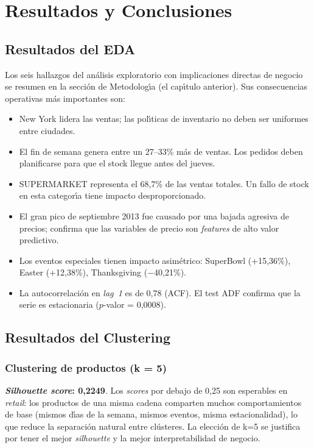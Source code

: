 \documentclass[12pt, a4paper, oneside]{report}
\begin{document}
\chapter{Resultados y Conclusiones}

\section{Resultados del EDA}

Los seis hallazgos del an\'alisis exploratorio con implicaciones directas de negocio se resumen en la secci\'on de Metodolog\'{\i}a (el cap\'{\i}tulo anterior). Sus consecuencias operativas m\'as importantes son:

\begin{itemize}[leftmargin=*, noitemsep]
  \item New York lidera las ventas; las pol\'{\i}ticas de inventario no deben ser uniformes entre ciudades.
  \item El fin de semana genera entre un 27--33\% m\'as de ventas. Los pedidos deben planificarse para que el stock llegue antes del jueves.
  \item SUPERMARKET representa el 68,7\% de las ventas totales. Un fallo de stock en esta categor\'{\i}a tiene impacto desproporcionado.
  \item El gran pico de septiembre 2013 fue causado por una bajada agresiva de precios; confirma que las variables de precio son \textit{features} de alto valor predictivo.
  \item Los eventos especiales tienen impacto asim\'etrico: SuperBowl (+15,36\%), Easter (+12,38\%), Thanksgiving ($-$40,21\%).
  \item La autocorrelaci\'on en \textit{lag~1} es de 0,78 (ACF). El test ADF confirma que la serie es estacionaria ($p$-valor = 0,0008).
\end{itemize}

\section{Resultados del Clustering}

\subsection{Clustering de productos (k = 5)}

\textbf{\textit{Silhouette score}: 0,2249}. Los \textit{scores} por debajo de 0,25 son esperables en \textit{retail}: los productos de una misma cadena comparten muchos comportamientos de base (mismos d\'{\i}as de la semana, mismos eventos, misma estacionalidad), lo que reduce la separaci\'on natural entre cl\'usteres. La elecci\'on de k=5 se justifica por tener el mejor \textit{silhouette} y la mejor interpretabilidad de negocio.
\end{document}
